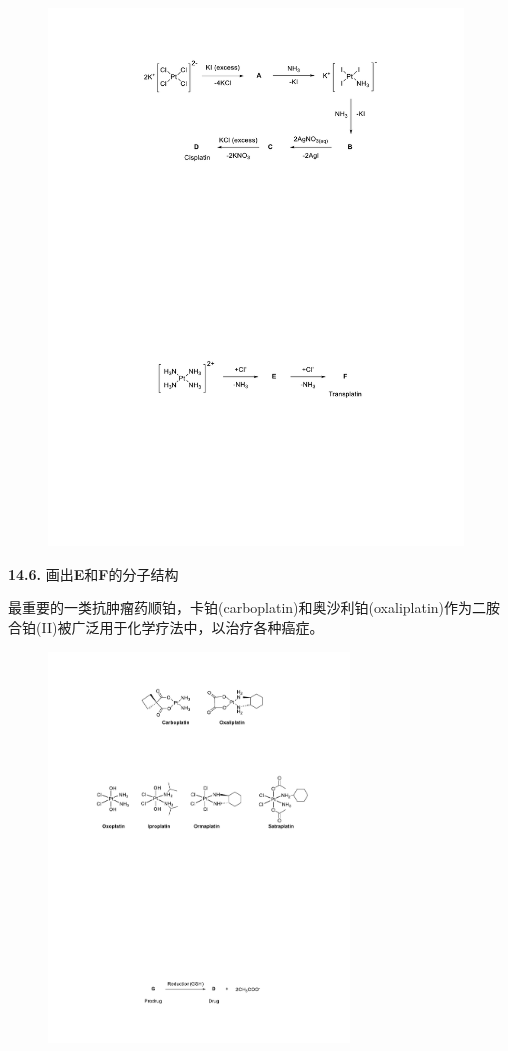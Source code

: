 \begin{figure}[h]
	\centering
	\includegraphics[width=11cm]{./pic/t14-3.pdf}
\end{figure}

\noindent\textbf{14.6.} 画出\textbf{E}和\textbf{F}的分子结构

最重要的一类抗肿瘤药顺铂，卡铂(carboplatin)和奥沙利铂(oxaliplatin)作为二胺合铂(II)被广泛用于化学疗法中，以治疗各种癌症。

\begin{figure}[h]
	\centering
	\includegraphics[width=8cm]{./pic/t14-4.pdf}
\end{figure}

